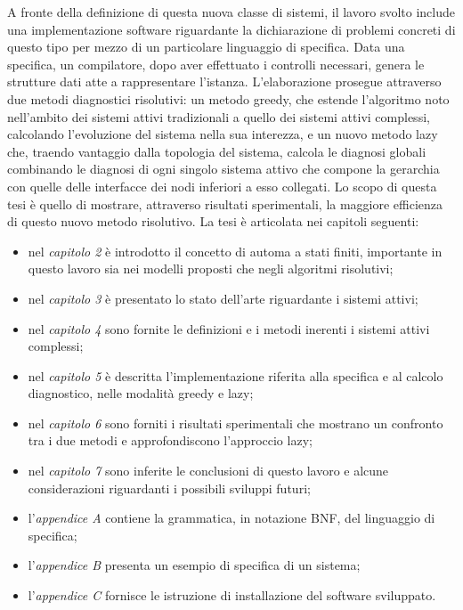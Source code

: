 A fronte della definizione di questa nuova classe di sistemi, il lavoro svolto include una implementazione software riguardante la dichiarazione di problemi concreti di questo tipo per mezzo di un particolare linguaggio di specifica. Data una specifica, un compilatore, dopo aver effettuato i controlli necessari, genera le strutture dati atte a rappresentare l'istanza. L'elaborazione prosegue attraverso due metodi diagnostici risolutivi: un metodo greedy, che estende l'algoritmo noto nell'ambito dei sistemi attivi tradizionali a quello dei sistemi attivi complessi, calcolando l'evoluzione del sistema nella sua interezza, e un nuovo metodo lazy che, traendo vantaggio dalla topologia del sistema, calcola le diagnosi globali combinando le diagnosi di ogni singolo sistema attivo che compone la gerarchia con quelle delle interfacce dei nodi inferiori a esso collegati. Lo scopo di questa tesi è quello di mostrare, attraverso risultati sperimentali, la maggiore efficienza di questo nuovo metodo risolutivo.
La tesi è articolata nei capitoli seguenti:
\begin{itemize}
\item nel \emph{capitolo 2} è introdotto il concetto di automa a stati finiti, importante in questo lavoro sia nei modelli proposti che negli algoritmi risolutivi;
\item nel \emph{capitolo 3} è presentato lo stato dell'arte riguardante i sistemi attivi;
\item nel \emph{capitolo 4} sono fornite le definizioni e i metodi inerenti i sistemi attivi complessi;
\item nel \emph{capitolo 5} è descritta l'implementazione riferita alla specifica e al calcolo diagnostico,  nelle modalità greedy e lazy;
\item nel \emph{capitolo 6} sono forniti i risultati sperimentali che mostrano un confronto tra i due metodi e approfondiscono l'approccio lazy;
\item nel \emph{capitolo 7} sono inferite le conclusioni di questo lavoro e alcune considerazioni riguardanti i possibili sviluppi futuri;
\item l'\emph{appendice A} contiene la grammatica, in notazione BNF, del linguaggio di specifica;
\item l'\emph{appendice B} presenta un esempio di specifica di un sistema;
\item l'\emph{appendice C} fornisce le istruzione di installazione del software sviluppato.
\end{itemize}
